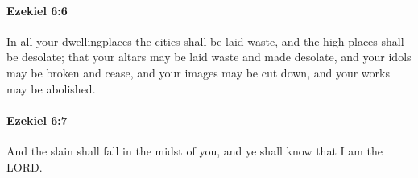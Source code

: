 		\paragraph{Ezekiel 6:6} %
			\label{EZEKIEL-6-6}

			In all your dwellingplaces the cities shall be laid waste, and the high places shall be desolate; that your altars may be laid waste and made desolate, and your idols may be broken and cease, and your images may be cut down, and your works may be abolished.


		\paragraph{Ezekiel 6:7} %
			\label{EZEKIEL-6-7}

			And the slain shall fall in the midst of you, and ye shall know that I am the LORD.


